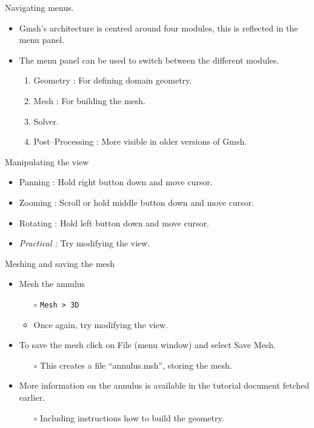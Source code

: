\documentclass[t]{beamer}
\begin{document}
\begin{frame}{Navigating menus.}
   \begin{itemize}
     \item Gmsh's architecture is centred around four modules, this is reflected in the menu panel.\\[10pt]
     \item The menu panel can be used to switch between the different modules.\\[10pt]
     \begin{enumerate}
       \item Geometry : For defining domain geometry.
       \item Mesh : For building the mesh.
       \item Solver.
       \item Post--Processing : More visible in older versions of Gmsh.
     \end{enumerate}
   \end{itemize}
\end{frame}

\begin{frame}{Manipulating the view}
\begin{itemize}
\item Panning : Hold right button down and move cursor.
\item Zooming : Scroll or hold middle button down and move cursor.
\item Rotating : Hold left button down and move cursor.
\item \emph{Practical :} Try modifying the view.
\end{itemize}
\end{frame}

\begin{frame}{Meshing and saving the mesh}
\begin{itemize}
\item Mesh the annulus
\begin{itemize}
  \item[$\circ$] \lstinline{Mesh > 3D}
  \item[$\circ$] Once again, try modifying the view.
\end{itemize}
\vspace{5pt}
\item To save the mesh click on File (menu window) and select Save Mesh.
\begin{itemize}
  \item[$\circ$] This creates a file ``annulus.msh'', storing the mesh.
\end{itemize}
\vspace{5pt}
\item More information on the annulus is available in the tutorial document fetched earlier.
\begin{itemize}
  \item[$\circ$] Including instructions how to build the geometry.
\end{itemize}
\end{itemize}
\end{frame}
\end{document}
